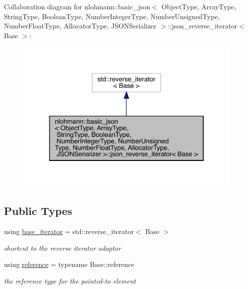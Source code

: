 Collaboration diagram for nlohmann\+::basic\+\_\+json$<$ Object\+Type, Array\+Type, String\+Type, Boolean\+Type, Number\+Integer\+Type, Number\+Unsigned\+Type, Number\+Float\+Type, Allocator\+Type, J\+S\+O\+N\+Serializer $>$\+::json\+\_\+reverse\+\_\+iterator$<$ Base $>$\+:
\nopagebreak
\begin{figure}[H]
\begin{center}
\leavevmode
\includegraphics[width=315pt]{classnlohmann_1_1basic__json_1_1json__reverse__iterator__coll__graph}
\end{center}
\end{figure}
\subsection*{Public Types}
\begin{DoxyCompactItemize}
\item 
using \mbox{\hyperlink{classnlohmann_1_1basic__json_1_1json__reverse__iterator_a5b7f3c5d86fe89a65d9552c1cac37261}{base\+\_\+iterator}} = std\+::reverse\+\_\+iterator$<$ Base $>$
\begin{DoxyCompactList}\small\item\em shortcut to the reverse iterator adaptor \end{DoxyCompactList}\item 
using \mbox{\hyperlink{classnlohmann_1_1basic__json_1_1json__reverse__iterator_ab0021ef2007fd338615360af404dcd4e}{reference}} = typename Base\+::reference
\begin{DoxyCompactList}\small\item\em the reference type for the pointed-\/to element \end{DoxyCompactList}\end{DoxyCompactItemize}
